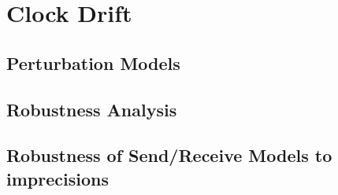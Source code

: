 \chapter{Clock Drift}\label{chap:6}
\minitoc
\section{Perturbation Models}
\section{Robustness Analysis}
\section{Robustness of Send/Receive Models to imprecisions}

~\cite{fm16,apsec17,lites,drift,sbip}

